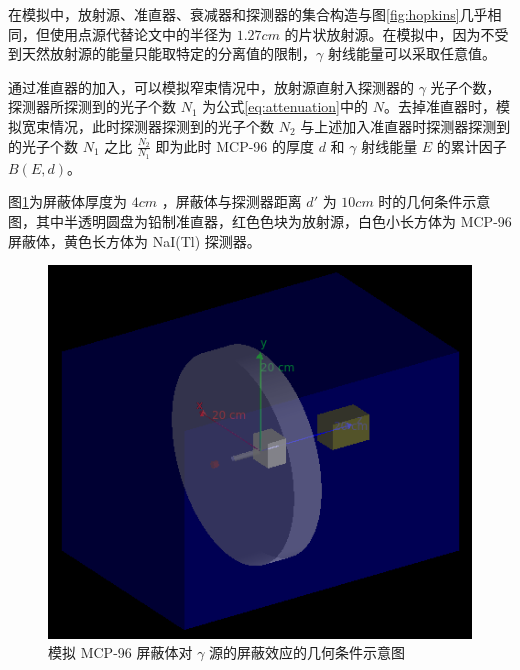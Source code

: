 在模拟中，放射源、准直器、衰减器和探测器的集合构造与图\ref{fig:hopkins}几乎相同，但使用点源代替论文\cite{hopkins_linear_2012}中的半径为 $1.27\si{cm}$ 的片状放射源。在模拟中，因为不受到天然放射源的能量只能取特定的分离值的限制，$\gamma$ 射线能量可以采取任意值。

通过准直器的加入，可以模拟窄束情况中，放射源直射入探测器的 $\gamma$ 光子个数，探测器所探测到的光子个数 $N_1$ 为公式\ref{eq:attenuation}中的 $N$。去掉准直器时，模拟宽束情况，此时探测器探测到的光子个数 $N_2$ 与上述加入准直器时探测器探测到的光子个数 $N_1$ 之比 $\frac{N_2}{N_1}$ 即为此时 MCP-96 的厚度 $d$ 和 $\gamma$ 射线能量 $E$ 的累计因子 $B(E, d)$。

图\ref{fig:sim}为屏蔽体厚度为 $4\si{cm}$ ，屏蔽体与探测器距离 $d'$ 为 $10\si{cm}$ 时的几何条件示意图，其中半透明圆盘为铅制准直器，红色色块为放射源，白色小长方体为 MCP-96 屏蔽体，黄色长方体为 NaI(Tl) 探测器。

\begin{figure}[H]
    \centering
    \includegraphics[width=\linewidth]{figures/sim.png}
    \caption{模拟 MCP-96 屏蔽体对 $\gamma$ 源的屏蔽效应的几何条件示意图}
    \label{fig:sim}
\end{figure}